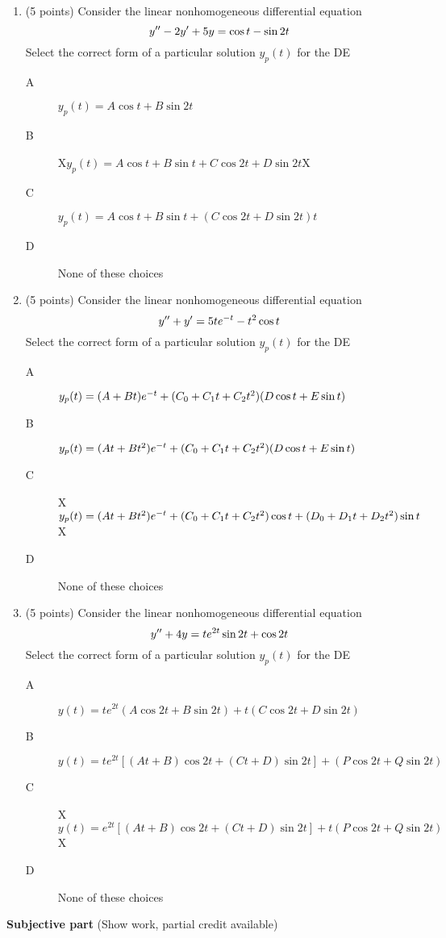 \documentclass{article}
\begin{document}
\begin{enumerate}

\item (5 points) Consider the linear nonhomogeneous differential equation
\[
y\sp{\prime\prime}-2y\sp{\prime}+5y=\cos t - \sin 2t
\]
Select the correct form of a particular solution $y_p(t)$ for the DE
\begin{description}
\item[A] $y_p(t)=A\cos t+B\sin 2t$		
\item[B] X$y_p(t)=A\cos t+B\sin t+C\cos 2t+D\sin 2t$X
\item[C] $y_p(t)=A\cos t+B\sin t+(C\cos 2t+D\sin 2t)t$
\item[D] None of these choices
\end{description}

\item (5 points) Consider the linear nonhomogeneous differential equation
\[
y\sp{\prime\prime}+y\sp{\prime}=5te\sp{-t}-t\sp2\cos t
\]
Select the correct form of a particular solution $y_p(t)$ for the DE
\begin{description}
\item[A] $y_p(t)=(A+Bt)e^{-t} + (C_0+C_1t+C_2t\sp2)(D\cos t+E\sin t)$ 
\item[B] $y_p(t)=(At+Bt\sp2)e^{-t} + (C_0+C_1t+C_2t\sp2)(D\cos t+E\sin t)$
\item[C] X$y_p(t)=(At+Bt\sp2)e^{-t} + (C_0+C_1t+C_2t\sp2)\cos t+(D_0+D_1t+D_2t\sp2)\sin t$X
\item[D] None of these choices
\end{description}

\item (5 points) Consider the linear nonhomogeneous differential equation
\[
y\sp{\prime\prime}+4y=te^{2t}\sin 2t + \cos 2t
\]
Select the correct form of a particular solution $y_p(t)$ for the DE
\begin{description}
\item[A] $y(t)=te^{2t} (A\cos 2t + B \sin 2t) + t(C\cos 2t + D \sin 2t)$ 	
\item[B] $y(t)=te^{2t} [(At+B) \cos 2t +(Ct+D) \sin 2t] + (P\cos 2t + Q \sin 2t)$
\item[C] X$y(t)=e^{2t} [(At+B) \cos 2t +(Ct+D) \sin 2t] + t(P\cos 2t + Q \sin 2t)$X
\item[D] None of these choices
\end{description}


\end{enumerate}

\bigskip\bigskip\noindent
{\bf Subjective part} (Show work, partial credit available)
\end{document}
